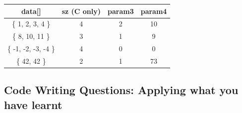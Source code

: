 \begin{enumerate}
\begin{enumerate}
    \begin{table}[h]
      \centering
      \begin{tabular}{|c|c|c|c|}
      \hline
       \textbf{data[]} & \textbf{sz} (C only)  & \textbf{param3} & \textbf{param4}  \\
       \hline 
       \{ 1, 2, 3, 4 \} & 4 & 2 & 10 \\
       \hline
       \{ 8, 10, 11 \} & 3 & 1 & 9 \\
       \hline
       \{ -1, -2, -3, -4 \} & 4 & 0 & 0 \\
       \hline
       \{ 42, 42 \} & 2 & 1 & 73 \\
       \hline
      \end{tabular}
    \end{table}
    
      \end{enumerate}
  \begin{figure}[h]
  \end{figure}
  \begin{figure}[h]
  \end{figure}

\end{enumerate}
\clearpage
\subsection{Code Writing Questions: Applying what you have learnt} %
\label{sub:code_writing_questions_applying_what_you_have_learnt_array}

